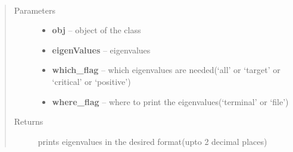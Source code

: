 \documentclass[letterpaper,10pt,english]{sphinxmanual}
\begin{document}

\begin{fulllineitems}
\label{index:brake.__init__.printEigs}~\begin{quote}\begin{description}
\item[{Parameters}] \leavevmode\begin{itemize}
\item {} 
\textbf{obj} -- object of the class 

\item {} 
\textbf{eigenValues} -- eigenvalues

\item {} 
\textbf{which\_flag} -- which eigenvalues are needed(`all' or `target' or `critical' or `positive')

\item {} 
\textbf{where\_flag} -- where to print the eigenvalues(`terminal' or `file')

\end{itemize}

\item[{Returns}] \leavevmode
prints eigenvalues in the desired format(upto 2 decimal places)

\end{description}\end{quote}

\end{fulllineitems}

\end{document}
